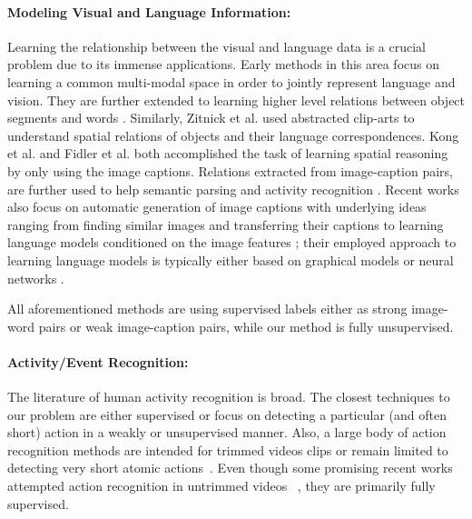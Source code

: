 \paragraph{Modeling Visual and Language Information:}
Learning the relationship between the visual and language data is a crucial problem due to its immense applications. Early methods \cite{matching} in this area focus on learning a common multi-modal space in order to jointly represent language and vision. They are further extended to learning higher level relations between object segments and words \cite{connecting}. Similarly, Zitnick et al.\cite{zitnick2013learning,zitnick2013bringing} used abstracted clip-arts to understand spatial relations of objects and their language correspondences. Kong et al. \cite{kong2014you} and Fidler et al. \cite{fidler2013sentence} both accomplished the task of learning spatial reasoning by only using the image captions. Relations extracted from image-caption pairs, are further used to help semantic parsing \cite{yu2013grounded} and activity recognition \cite{motwani2012improving}. Recent works also focus on automatic generation of image captions with underlying ideas ranging from finding similar images and transferring their captions \cite{ordonez2011im2text} to learning language models conditioned on the image features \cite{kiros2014multimodal,socher2014grounded,farhadi2010every}; their employed approach to learning language models is typically either based on graphical models \cite{farhadi2010every} or neural networks \cite{socher2014grounded,kiros2014multimodal,deepAlignment}.

All aforementioned methods are using supervised labels either as strong image-word pairs or weak image-caption pairs, while our method is fully unsupervised.

\paragraph{Activity/Event Recognition:}
The literature of human activity recognition is broad. The closest techniques to our problem are either supervised or focus on detecting a particular (and often short) action in a weakly or unsupervised manner. Also, a large body of action recognition methods are intended for trimmed videos clips or remain limited to detecting very short atomic actions~\cite{kuehne2011hmdb, UCF101, niebles10_eccv, laptev08_cvpr, efros03_iccv, ryoo09_iccv}. Even though some promising recent works attempted action recognition in untrimmed videos ~\cite{THUMOS14, oneata2014lear, jainuniversity}, they are primarily fully supervised. 

